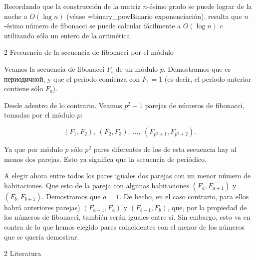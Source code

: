 Recordando que la construcción de la matriz $n$-ésimo grado se puede lograr de la noche a $O (\log n)$ (véase \algohref=binary_pow{Binario exponenciación}), resulta que $n$-ésimo número de fibonacci se puede calcular fácilmente a $O (\log n)$ c utilizando sólo un entero de la aritmética.


\h2{ Frecuencia de la secuencia de fibonacci por el módulo }

Veamos la secuencia de fibonacci $F_i$ de un módulo $p$. Demostramos que es периодичной, y que el período comienza con $F_1=1$ (es decir, el período anterior contiene sólo $F_0$).

Desde adentro de lo contrario. Veamos $p^2+1$ parejas de números de fibonacci, tomadas por el módulo $p$:

$$(F_1,F_2),\ (F_2,F_3),\ \ldots,\ (F_{p^2+1},F_{p^2+2}).$$

Ya que por módulo $p$ sólo $p^2$ pares diferentes de los de esta secuencia hay al menos dos parejas. Esto ya significa que la secuencia de periódico.

A elegir ahora entre todos los pares iguales dos parejas con un menor número de habitaciones. Que esto de la pareja con algunas habitaciones $(F_a,F_{a+1})$ y $(F_b,F_{b+1})$. Demostramos que $a=1$. De hecho, en el caso contrario, para ellos habrá anteriores parejas) $(F_{a-1},F_a)$ y $(F_{b-1},F_b)$, que, por la propiedad de los números de fibonacci, también serán iguales entre sí. Sin embargo, esto va en contra de lo que hemos elegido pares coincidentes con el menor de los números que se quería demostrar.


\h2{ Literatura }

\ul{
\li {}
}
